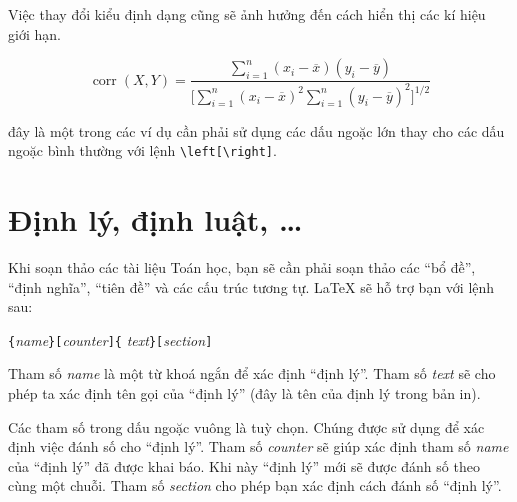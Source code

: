 Việc thay đổi kiểu định dạng cũng sẽ ảnh hưởng đến cách hiển thị các kí hiệu giới hạn.
\begin{example}
\begin{displaymath}
\mathop{\mathrm{corr}}(X,Y)=
 \frac{\displaystyle
   \sum_{i=1}^n(x_i-\overline x)
   (y_i-\overline y)}
  {\displaystyle\biggl[
 \sum_{i=1}^n(x_i-\overline x)^2
\sum_{i=1}^n(y_i-\overline y)^2
\biggr]^{1/2}}
\end{displaymath}
\end{example}
\noindent đây là một trong các ví dụ cần phải sử dụng các dấu ngoặc lớn thay cho các dấu ngoặc bình thường với lệnh
\verb|\left[\right]|.

\section{Định lý, định luật, \ldots}
Khi soạn thảo các tài liệu Toán học, bạn sẽ cần phải soạn thảo các ``bổ đề'', ``định nghĩa'', ``tiên đề'' và các cấu trúc tương tự. \LaTeX{} sẽ hỗ trợ bạn với lệnh sau:
\begin{lscommand}
\verb|{|\emph{name}\verb|}[|\emph{counter}\verb|]{|%
         \emph{text}\verb|}[|\emph{section}\verb|]|
\end{lscommand}
Tham số \emph{name} là một từ khoá ngắn để xác định ``định lý''. Tham số \emph{text} sẽ cho phép ta xác định tên gọi của ``định lý'' (đây là tên của định lý trong bản in).

Các tham số trong dấu ngoặc vuông là tuỳ chọn. Chúng được sử dụng để xác định việc đánh số cho ``định lý''. Tham số  \emph{counter} sẽ giúp xác định tham số \emph{name} của ``định lý'' đã được khai báo. Khi này ``định lý'' mới sẽ được đánh số theo cùng một chuỗi. Tham số \emph{section} cho phép bạn xác định cách đánh số ``định lý''.

